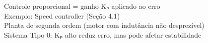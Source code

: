 \documentclass[preview]{standalone}
\begin{document}
Controle proporcional = ganho Kₚ aplicado ao erro\\Exemplo: Speed controller (Seção 4.1)\\Planta de segunda ordem (motor com indutância não desprezível)\\Sistema Tipo 0: Kₚ alto reduz erro, mas pode afetar estabilidade\\
\end{document}
